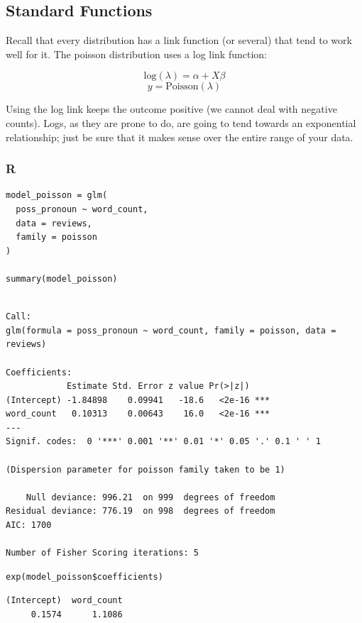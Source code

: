 \documentclass[
  letterpaper,
]{krantz}
\begin{document}
\subsection{Standard Functions}\label{sec-glm-poisson-standard}

Recall that every distribution has a link function (or several) that
tend to work well for it. The poisson distribution uses a log link
function:

\[\text{log}(\lambda) = \alpha + X\beta\]
\[y = \textrm{Poisson}(\lambda)\]

Using the log link keeps the outcome positive (we cannot deal with
negative counts). Logs, as they are prone to do, are going to tend
towards an exponential relationship; just be sure that it makes sense
over the entire range of your data.

\subsubsection{R}

\begin{verbatim}
model_poisson = glm(
  poss_pronoun ~ word_count,
  data = reviews,
  family = poisson
)

summary(model_poisson)
\end{verbatim}

\begin{verbatim}

Call:
glm(formula = poss_pronoun ~ word_count, family = poisson, data = reviews)

Coefficients:
            Estimate Std. Error z value Pr(>|z|)    
(Intercept) -1.84898    0.09941   -18.6   <2e-16 ***
word_count   0.10313    0.00643    16.0   <2e-16 ***
---
Signif. codes:  0 '***' 0.001 '**' 0.01 '*' 0.05 '.' 0.1 ' ' 1

(Dispersion parameter for poisson family taken to be 1)

    Null deviance: 996.21  on 999  degrees of freedom
Residual deviance: 776.19  on 998  degrees of freedom
AIC: 1700

Number of Fisher Scoring iterations: 5
\end{verbatim}

\begin{verbatim}
exp(model_poisson$coefficients)
\end{verbatim}

\begin{verbatim}
(Intercept)  word_count 
     0.1574      1.1086 
\end{verbatim}
\end{document}
